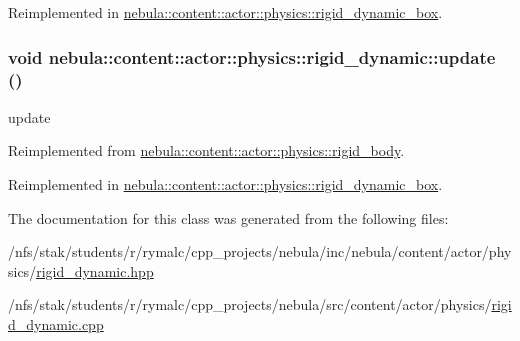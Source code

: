 Reimplemented in \hyperlink{classnebula_1_1content_1_1actor_1_1physics_1_1rigid__dynamic__box_a849dd1aec8bf8be223dc3d7d9c1f81b5}{nebula::content::actor::physics::rigid\_\-dynamic\_\-box}.\hypertarget{classnebula_1_1content_1_1actor_1_1physics_1_1rigid__dynamic_a37baf9ed4986782294789073ebb05f19}{
\subsubsection[{update}]{\setlength{\rightskip}{0pt plus 5cm}void nebula::content::actor::physics::rigid\_\-dynamic::update ()}}
\label{classnebula_1_1content_1_1actor_1_1physics_1_1rigid__dynamic_a37baf9ed4986782294789073ebb05f19}


update 

Reimplemented from \hyperlink{classnebula_1_1content_1_1actor_1_1physics_1_1rigid__body_a7c8c0d4a581a36f3015912d1d73166f6}{nebula::content::actor::physics::rigid\_\-body}.

Reimplemented in \hyperlink{classnebula_1_1content_1_1actor_1_1physics_1_1rigid__dynamic__box_ac3f90a5c975d090930fb77f5961e7064}{nebula::content::actor::physics::rigid\_\-dynamic\_\-box}.

The documentation for this class was generated from the following files:\begin{DoxyCompactItemize}
\item 
/nfs/stak/students/r/rymalc/cpp\_\-projects/nebula/inc/nebula/content/actor/physics/\hyperlink{physics_2rigid__dynamic_8hpp}{rigid\_\-dynamic.hpp}\item 
/nfs/stak/students/r/rymalc/cpp\_\-projects/nebula/src/content/actor/physics/\hyperlink{physics_2rigid__dynamic_8cpp}{rigid\_\-dynamic.cpp}\end{DoxyCompactItemize}
